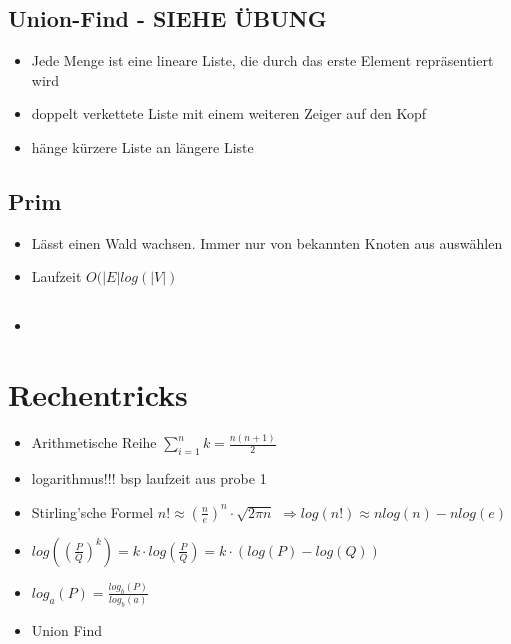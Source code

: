 \documentclass{article}
\begin{document}
\subsection{Union-Find - SIEHE ÜBUNG}
\begin{itemize}
\item Jede Menge ist eine lineare Liste, die durch das erste Element repräsentiert wird
\item doppelt verkettete Liste mit einem weiteren Zeiger auf den Kopf
\item hänge kürzere Liste an längere Liste
\end{itemize}

\subsection{Prim}
\begin{itemize}
\item Lässt einen Wald wachsen. Immer nur von bekannten Knoten aus auswählen
\item  Laufzeit $O(|E| log(|V|)$
\end{itemize}







\subsection{}
\begin{itemize}
\item
\end{itemize}



\section{Rechentricks}
\begin{itemize}
\item Arithmetische Reihe $\sum_{i=1}^n k  = \frac{n(n+1)}{2} $
\item logarithmus!!! bsp laufzeit aus probe 1
\item Stirling'sche Formel $n! \approx (\frac{n}{e})^n \cdot \sqrt{2\pi n}$ \newline
$ \Rightarrow  log(n!) \approx nlog(n)-nlog(e)$
\item $log((\frac{P}{Q})^k) = k \cdot log(\frac{P}{Q}) = k \cdot (log(P) - log(Q)) $
\item $log_a(P) = \frac{log_b(P)}{log_b(a)}$

\item Union Find

\end{itemize}
\end{document}
